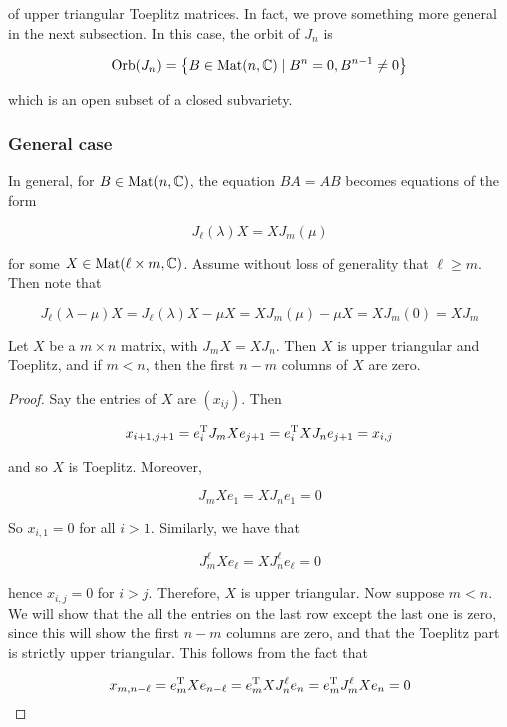\documentclass{article}
\begin{document}
of upper triangular Toeplitz matrices. In fact, we prove something more general in the next subsection. In this case, the orbit of \(J_n\) is

\[\operatorname{Orb}(J_n) = \left\{B \in \operatorname{Mat}(n, \mathbb{C}) \mid B^n = 0, B^{n-1} \ne 0\right\}\]

which is an open subset of a closed subvariety.

\subsubsection{General case}

In general, for \(B \in \operatorname{Mat}(n, \mathbb{C})\), the equation \(BA = AB\) becomes equations of the form

\[J_\ell(\lambda)X = XJ_m(\mu)\]

for some \(X \in \operatorname{Mat}(\ell \times m, \mathbb{C})\). Assume without loss of generality that \(\ell \ge m\). Then note that

\[J_\ell(\lambda - \mu)X = J_\ell(\lambda)X - \mu X = XJ_m(\mu) - \mu X = XJ_m(0) = X J_m\]

\begin{lemma*}
    Let \(X\) be a \(m \times n\) matrix, with \(J_mX = XJ_n\). Then \(X\) is upper triangular and Toeplitz, and if \(m < n\), then the first \(n - m\) columns of \(X\) are zero.
\end{lemma*}

\begin{proof}
    Say the entries of \(X\) are \((x_{ij})\). Then

    \[x_{i+1, j+1} = e_i^{\mathrm{T}} J_m Xe_{j+1} = e_i^{\mathrm{T}} X J_n e_{j+1} = x_{i, j}\]

    and so \(X\) is Toeplitz. Moreover,

    \[J_m X e_1 = X J_n e_1 = 0\]

    So \(x_{i, 1} = 0\) for all \(i > 1\). Similarly, we have that

    \[J_m^\ell X e_\ell = X J_n^\ell e_\ell = 0\]

    hence \(x_{i, j} = 0\) for \(i > j\). Therefore, \(X\) is upper triangular. Now suppose \(m < n\). We will show that the all the entries on the last row except the last one is zero, since this will show the first \(n - m\) columns are zero, and that the Toeplitz part is strictly upper triangular. This follows from the fact that

    \[x_{m, n-\ell} = e_m^{\mathrm{T}} X e_{n-\ell} =  e_m^{\mathrm{T}} X J_n^\ell e_n = e_m^{\mathrm{T}} J_m^\ell X e_n = 0\]
\end{proof}
\end{document}
